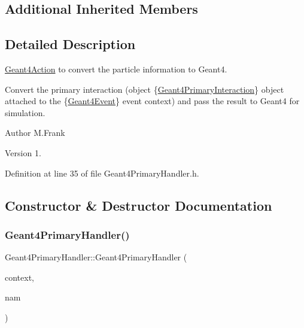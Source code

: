 \subsection*{Additional Inherited Members}


\subsection{Detailed Description}
\hyperlink{class_d_d4hep_1_1_simulation_1_1_geant4_action}{Geant4\+Action} to convert the particle information to Geant4. 

Convert the primary interaction (object \{\hyperlink{class_d_d4hep_1_1_simulation_1_1_geant4_primary_interaction}{Geant4\+Primary\+Interaction}\} object attached to the \{\hyperlink{class_d_d4hep_1_1_simulation_1_1_geant4_event}{Geant4\+Event}\} event context) and pass the result to Geant4 for simulation.

\begin{DoxyAuthor}{Author}
M.\+Frank 
\end{DoxyAuthor}
\begin{DoxyVersion}{Version}
1. 
\end{DoxyVersion}


Definition at line 35 of file Geant4\+Primary\+Handler.\+h.



\subsection{Constructor \& Destructor Documentation}
\hypertarget{class_d_d4hep_1_1_simulation_1_1_geant4_primary_handler_abc9c6880682a0ade66bdb15774e67180}{}\label{class_d_d4hep_1_1_simulation_1_1_geant4_primary_handler_abc9c6880682a0ade66bdb15774e67180} 
\subsubsection{\texorpdfstring{Geant4\+Primary\+Handler()}{Geant4PrimaryHandler()}}
{\footnotesize\ttfamily Geant4\+Primary\+Handler\+::\+Geant4\+Primary\+Handler (\begin{DoxyParamCaption}\item[{\hyperlink{class_d_d4hep_1_1_simulation_1_1_geant4_context}{Geant4\+Context} $\ast$}]{context,  }\item[{const std\+::string \&}]{nam }\end{DoxyParamCaption})}



